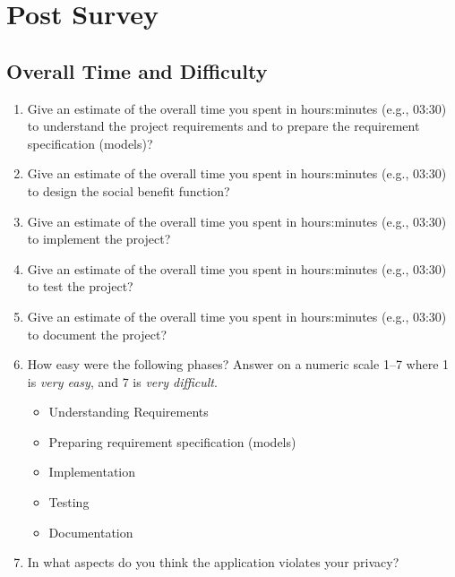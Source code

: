 \section{Post Survey}
\label{appsec:postsurvey}

\subsection*{Overall Time and Difficulty}

\begin{enumerate}
\item Give an estimate of the overall time you spent in hours:minutes (e.g., 03:30) to understand the project requirements and to prepare the requirement specification (models)? 


\item Give an estimate of the overall time you spent in hours:minutes (e.g., 03:30) to design the social benefit function? 


\item Give an estimate of the overall time you spent in hours:minutes (e.g., 03:30) to implement the project? 


\item Give an estimate of the overall time you spent in hours:minutes (e.g., 03:30) to test the project? 


\item Give an estimate of the overall time you spent in hours:minutes (e.g., 03:30) to document the project? 



\item How easy were the following phases? 
Answer on a numeric scale 1--7 where 1 is \emph{very easy}, and 7 is \emph{very difficult}.

\begin{itemize}
\item Understanding Requirements	
\item Preparing requirement specification (models)	
\item Implementation	
\item Testing	
\item Documentation	
\end{itemize}

\item In what aspects do you think the application violates your privacy?

\end{enumerate}

